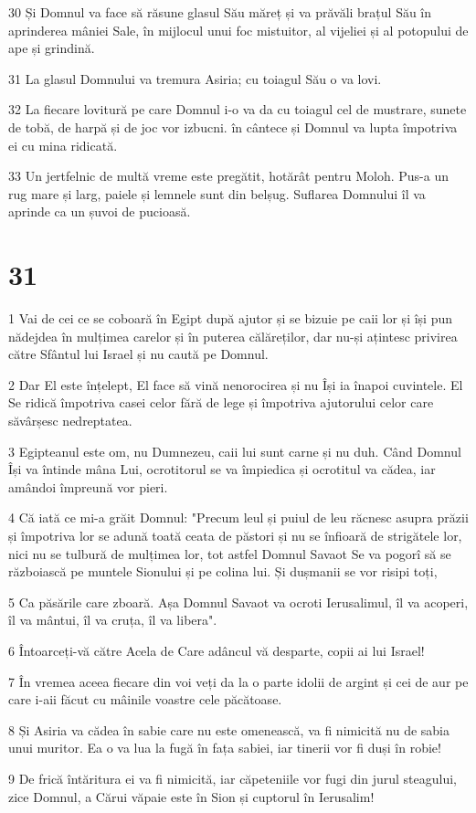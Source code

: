 \par 30 Și Domnul va face să răsune glasul Său măreț și va prăvăli brațul Său în aprinderea mâniei Sale, în mijlocul unui foc mistuitor, al vijeliei și al potopului de ape și grindină.
\par 31 La glasul Domnului va tremura Asiria; cu toiagul Său o va lovi.
\par 32 La fiecare lovitură pe care Domnul i-o va da cu toiagul cel de mustrare, sunete de tobă, de harpă și de joc vor izbucni. în cântece și Domnul va lupta împotriva ei cu mina ridicată.
\par 33 Un jertfelnic de multă vreme este pregătit, hotărât pentru Moloh. Pus-a un rug mare și larg, paiele și lemnele sunt din belșug. Suflarea Domnului îl va aprinde ca un șuvoi de pucioasă.

\chapter{31}

\par 1 Vai de cei ce se coboară în Egipt după ajutor și se bizuie pe caii lor și își pun nădejdea în mulțimea carelor și în puterea călăreților, dar nu-și ațintesc privirea către Sfântul lui Israel și nu caută pe Domnul.
\par 2 Dar El este înțelept, El face să vină nenorocirea și nu Își ia înapoi cuvintele. El Se ridică împotriva casei celor fără de lege și împotriva ajutorului celor care săvârșesc nedreptatea.
\par 3 Egipteanul este om, nu Dumnezeu, caii lui sunt carne și nu duh. Când Domnul Își va întinde mâna Lui, ocrotitorul se va împiedica și ocrotitul va cădea, iar amândoi împreună vor pieri.
\par 4 Că iată ce mi-a grăit Domnul: "Precum leul și puiul de leu răcnesc asupra prăzii și împotriva lor se adună toată ceata de păstori și nu se înfioară de strigătele lor, nici nu se tulbură de mulțimea lor, tot astfel Domnul Savaot Se va pogorî să se războiască pe muntele Sionului și pe colina lui. Și dușmanii se vor risipi toți,
\par 5 Ca păsările care zboară. Așa Domnul Savaot va ocroti Ierusalimul, îl va acoperi, îl va mântui, îl va cruța, îl va libera".
\par 6 Întoarceți-vă către Acela de Care adâncul vă desparte, copii ai lui Israel!
\par 7 În vremea aceea fiecare din voi veți da la o parte idolii de argint și cei de aur pe care i-aii făcut cu mâinile voastre cele păcătoase.
\par 8 Și Asiria va cădea în sabie care nu este omenească, va fi nimicită nu de sabia unui muritor. Ea o va lua la fugă în fața sabiei, iar tinerii vor fi duși în robie!
\par 9 De frică întăritura ei va fi nimicită, iar căpeteniile vor fugi din jurul steagului, zice Domnul, a Cărui văpaie este în Sion și cuptorul în Ierusalim!

